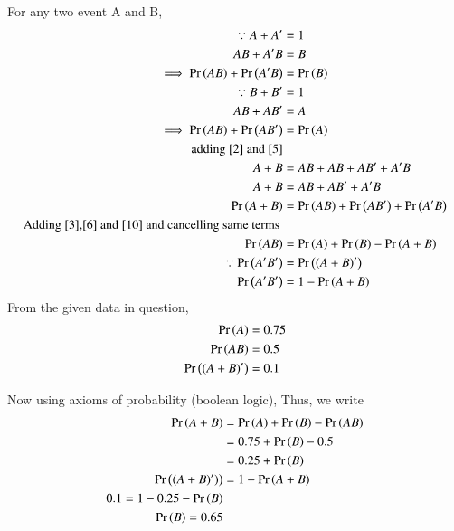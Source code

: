 \documentclass[journal]{IEEEtran}
\numberwithin{equation}{enumi}
\numberwithin{figure}{enumi}
\begin{document}
\begin{enumerate}
 For any two event A and B,
\begin{align}
	\because A + A^\prime &= 1 \\
	 AB + A^\prime B &= B \label{2} \\
	 \implies \Pr\left(AB\right) + \Pr\left(A^\prime B\right) &= \Pr\left(B\right) \label{3} \\
	 \because B + B^\prime &= 1 \\
	 AB + AB^\prime &= A \label{5}\\
	 \implies \Pr\left(AB\right) + \Pr\left(AB^\prime\right) &= \Pr\left(A\right) \label{6} \\
	 \text{adding } \eqref{2} \text{ and } \eqref{5} \\
	 A + B &= AB + AB + AB^\prime + A^\prime B  \\
	 A + B &= AB + AB^\prime + A^\prime B \\ 
	 \Pr\left(A + B\right) &= \Pr\left(AB\right) + \Pr\left(AB^\prime\right) + \Pr\left(A^\prime B\right) \label{10}\\
	 \text{Adding \eqref{3},\eqref{6} and \eqref{10} and cancelling same terms } \\
	 \Pr\left(AB\right) &= \Pr\left(A\right) + \Pr\left(B\right) - \Pr\left(A + B\right) \\
	 \because \Pr\left(A^\prime B^\prime\right) &=  \Pr\left(\left(A + B\right)^\prime\right) \label{13} \\
	 \Pr\left(A^\prime  B^\prime\right) &=  1 - \Pr\left(A+B\right) \label{14}
\end{align}
From the given data in question,
    \begin{align}
        \Pr\left(A\right) &= 0.75 \\
        \Pr\left(AB\right) &= 0.5 \\
        \Pr\left((A+B)^\prime\right) &= 0.1      
    \end{align}

    Now using axioms of probability (boolean logic),
Thus, we write
    \begin{align}
	    \Pr\left(A + B\right) &= \Pr\left(A\right) +  \Pr\left(B\right) - \Pr\left(A B\right) \\
	                                 &= 0.75+\Pr\left(B\right)-0.5 \\
	                                 &= 0.25+\Pr\left(B\right) \\
	     \Pr\left((A+B)^\prime)\right) &=  1 - \Pr\left(A+B\right) \\ 
	     0.1=1-0.25-\Pr\left(B\right)\\
         \Pr\left(B\right)=0.65
    \end{align} 
\end{enumerate}
\end{document}
